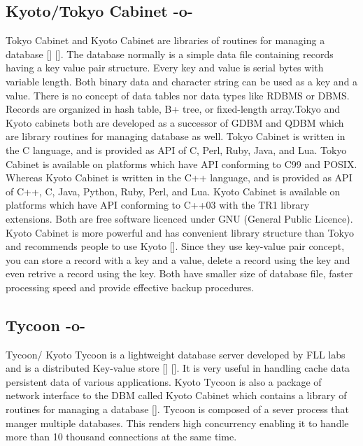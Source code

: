 \subsection{Kyoto/Tokyo Cabinet -o-}

Tokyo Cabinet and Kyoto Cabinet are libraries of routines for managing
a database [\cite{www-tokyo-cabinet}] [\cite{www-kyoto-cabinet}].  The
database normally is a simple data file containing records having a
key value pair structure. Every key and value is serial bytes with
variable length. Both binary data and character string can be used as
a key and a value. There is no concept of data tables nor data types
like RDBMS or DBMS. Records are organized in hash table, B+ tree, or
fixed-length array.Tokyo and Kyoto cabinets both are developed as a
successor of GDBM and QDBM which are library routines for managing
database as well. Tokyo Cabinet is written in the C language, and is
provided as API of C, Perl, Ruby, Java, and Lua. Tokyo Cabinet is
available on platforms which have API conforming to C99 and
POSIX. Whereas Kyoto Cabinet is written in the C++ language, and is
provided as API of C++, C, Java, Python, Ruby, Perl, and Lua. Kyoto
Cabinet is available on platforms which have API conforming to C++03
with the TR1 library extensions. Both are free software licenced under
GNU (General Public Licence). Kyoto Cabinet is more powerful and has
convenient library structure than Tokyo and recommends people to use
Kyoto [\cite{www-tokyo-cabinet}]. Since they use key-value pair
concept, you can store a record with a key and a value, delete a
record using the key and even retrive a record using the key. Both
have smaller size of database file, faster processing speed and
provide effective backup procedures.



     
\subsection{Tycoon -o-}

Tycoon/ Kyoto Tycoon is a lightweight database server developed by FLL
labs and is a distributed Key-value
store [\cite{www-cloufare-tycoon}] [\cite{www-fallabs-tycoon}].  It is
very useful in handling cache data persistent data of various
applications. Kyoto Tycoon is also a package of network interface to
the DBM called Kyoto Cabinet which contains a library of routines for
managing a database [\cite{www-fallabs-kyoto}]. Tycoon is composed of a
sever process that manger multiple databases. This renders high
concurrency enabling it to handle more than 10 thousand connections at
the same time.


